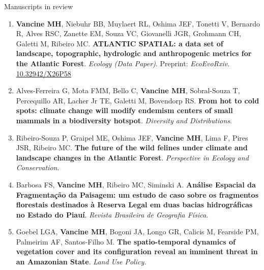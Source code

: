 \documentclass{resume}
\begin{document}

\begin{rSection}{Manuscripts in review}

\begin{enumerate} 

\item {\bf Vancine MH}, Niebuhr BB, Muylaert RL, Oshima JEF, Tonetti V, Bernardo R, Alves RSC, Zanette EM, Souza VC, Giovanelli JGR, Grohmann CH, Galetti M, Ribeiro MC. {\bf ATLANTIC  SPATIAL:  a  data  set  of  landscape,  topographic,  hydrologic  and  anthropogenic metrics for the Atlantic Forest}. {\it Ecology (Data Paper)}. Preprint: {\it EcoEvoRxiv}. \href{https://doi.org/10.32942/X26P58}{\underline{10.32942/X26P58}}

\item Alves-Ferreira G, Mota FMM, Bello C, {\bf Vancine MH}, Sobral-Souza T, Percequillo AR, Lacher Jr TE, Galetti M, Bovendorp RS. {\bf From hot to cold spots: climate change will modify endemism centers of small mammals in a biodiversity hotspot}. {\it Diversity and Distributions}.

\item Ribeiro-Souza P, Graipel ME, Oshima JEF, {\bf Vancine MH}, Lima F, Pires JSR, Ribeiro MC. {\bf The future of the wild felines under climate and landscape changes in the Atlantic Forest}. {\it Perspective in Ecology and Conservation}.

\item Barbosa FS, {\bf Vancine MH}, Ribeiro MC, Siminski A. {\bf Análise Espacial da Fragmentação da Paisagem: um estudo de caso sobre os fragmentos florestais destinados à Reserva Legal em duas bacias hidrográficas no Estado do Piauí}. {\it Revista Brasileira de Geografia Física.}

\item Goebel LGA, {\bf Vancine MH}, Bogoni JA, Longo GR, Calicis M, Fearside PM, Palmeirim AF, Santos-Filho M. {\bf The spatio-temporal dynamics of vegetation cover and its configuration reveal an imminent threat in an Amazonian State}. {\it Land Use Policy.}

\end{enumerate} 

\end{rSection}

\end{document}
